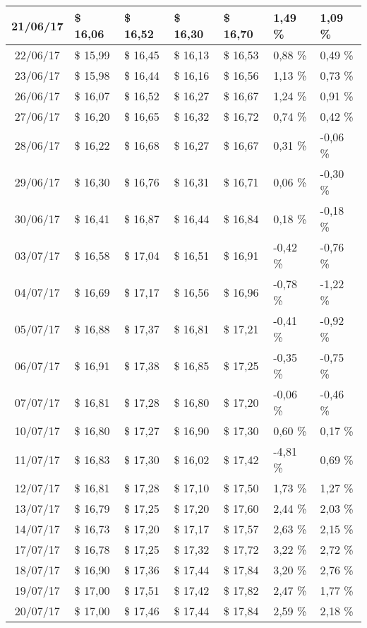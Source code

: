 \begin{center}
\begin{longtable}{|c|p{1.5cm}|p{1.5cm}|p{1.5cm}|p{1.5cm}|p{1.5cm}|p{1.5cm}|}
21/06/17 & \$ 16,06 & \$ 16,52 & \$ 16,30 & \$ 16,70 & 1,49 \% & 1,09 \% \\ \hline
22/06/17 & \$ 15,99 & \$ 16,45 & \$ 16,13 & \$ 16,53 & 0,88 \% & 0,49 \% \\ \hline
23/06/17 & \$ 15,98 & \$ 16,44 & \$ 16,16 & \$ 16,56 & 1,13 \% & 0,73 \% \\ \hline
26/06/17 & \$ 16,07 & \$ 16,52 & \$ 16,27 & \$ 16,67 & 1,24 \% & 0,91 \% \\ \hline
27/06/17 & \$ 16,20 & \$ 16,65 & \$ 16,32 & \$ 16,72 & 0,74 \% & 0,42 \% \\ \hline
28/06/17 & \$ 16,22 & \$ 16,68 & \$ 16,27 & \$ 16,67 & 0,31 \% & -0,06 \% \\ \hline
29/06/17 & \$ 16,30 & \$ 16,76 & \$ 16,31 & \$ 16,71 & 0,06 \% & -0,30 \% \\ \hline
30/06/17 & \$ 16,41 & \$ 16,87 & \$ 16,44 & \$ 16,84 & 0,18 \% & -0,18 \% \\ \hline
03/07/17 & \$ 16,58 & \$ 17,04 & \$ 16,51 & \$ 16,91 & -0,42 \% & -0,76 \% \\ \hline
04/07/17 & \$ 16,69 & \$ 17,17 & \$ 16,56 & \$ 16,96 & -0,78 \% & -1,22 \% \\ \hline
05/07/17 & \$ 16,88 & \$ 17,37 & \$ 16,81 & \$ 17,21 & -0,41 \% & -0,92 \% \\ \hline
06/07/17 & \$ 16,91 & \$ 17,38 & \$ 16,85 & \$ 17,25 & -0,35 \% & -0,75 \% \\ \hline
07/07/17 & \$ 16,81 & \$ 17,28 & \$ 16,80 & \$ 17,20 & -0,06 \% & -0,46 \% \\ \hline
10/07/17 & \$ 16,80 & \$ 17,27 & \$ 16,90 & \$ 17,30 & 0,60 \% & 0,17 \% \\ \hline
11/07/17 & \$ 16,83 & \$ 17,30 & \$ 16,02 & \$ 17,42 & -4,81 \% & 0,69 \% \\ \hline
12/07/17 & \$ 16,81 & \$ 17,28 & \$ 17,10 & \$ 17,50 & 1,73 \% & 1,27 \% \\ \hline
13/07/17 & \$ 16,79 & \$ 17,25 & \$ 17,20 & \$ 17,60 & 2,44 \% & 2,03 \% \\ \hline
14/07/17 & \$ 16,73 & \$ 17,20 & \$ 17,17 & \$ 17,57 & 2,63 \% & 2,15 \% \\ \hline
17/07/17 & \$ 16,78 & \$ 17,25 & \$ 17,32 & \$ 17,72 & 3,22 \% & 2,72 \% \\ \hline
18/07/17 & \$ 16,90 & \$ 17,36 & \$ 17,44 & \$ 17,84 & 3,20 \% & 2,76 \% \\ \hline
19/07/17 & \$ 17,00 & \$ 17,51 & \$ 17,42 & \$ 17,82 & 2,47 \% & 1,77 \% \\ \hline
20/07/17 & \$ 17,00 & \$ 17,46 & \$ 17,44 & \$ 17,84 & 2,59 \% & 2,18 \% \\ \hline

\end{longtable}
\end{center}
